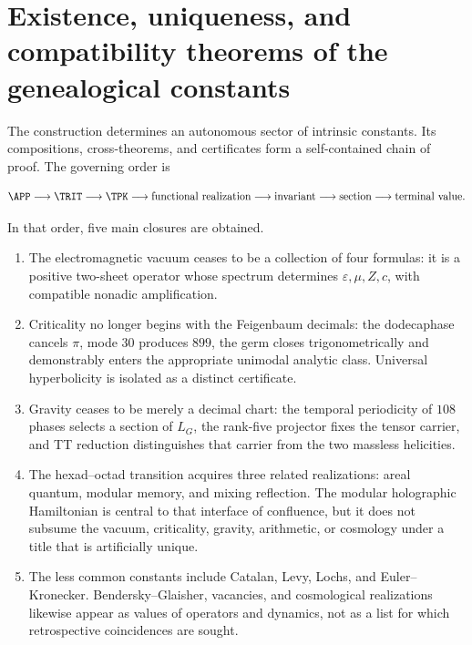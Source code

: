 
\section{Existence, uniqueness, and compatibility theorems of the genealogical constants}

The construction determines an autonomous sector of intrinsic constants.
Its compositions, cross-theorems, and certificates form a self-contained
chain of proof. The governing order is

{\small
\begin{equation}
\APP\longrightarrow\TRIT\longrightarrow\TPK
\longrightarrow\text{functional realization}
\longrightarrow\text{invariant}
\longrightarrow\text{section}
\longrightarrow\text{terminal value}.
\label{eq:final-causal-chain}
\end{equation}
}

In that order, five main closures are obtained.

\begin{enumerate}
\item The electromagnetic vacuum ceases to be a collection of four
formulas: it is a positive two-sheet operator whose spectrum determines
\(\varepsilon,\mu,Z,c\), with compatible nonadic amplification.

\item Criticality no longer begins with the Feigenbaum decimals: the
dodecaphase cancels \(\pi\), mode \(30\) produces \(899\), the germ closes
trigonometrically and demonstrably enters the appropriate unimodal analytic
class. Universal hyperbolicity is isolated as a
distinct certificate.

\item Gravity ceases to be merely a decimal chart: the
temporal periodicity of \(108\) phases selects a
section of \(L_G\), the rank-five projector fixes the
tensor carrier, and TT reduction distinguishes that carrier
from the two massless helicities.

\item The hexad--octad transition acquires three related realizations:
areal quantum, modular memory, and mixing reflection. The modular
holographic Hamiltonian is central to that interface of confluence, but it does not
subsume the vacuum, criticality, gravity, arithmetic, or cosmology
under a title that is artificially unique.

\item The less common constants include Catalan, Levy, Lochs, and
Euler--Kronecker. Bendersky--Glaisher, vacancies, and cosmological realizations
likewise appear as values of operators and dynamics, not as a list
for which retrospective coincidences are sought.
\end{enumerate}

